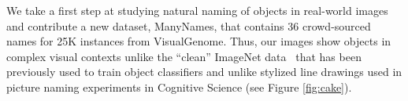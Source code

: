 
We take a first step at studying natural naming of objects in real-world images and contribute a new dataset, ManyNames, that contains 36 crowd-sourced names for 25K instances from VisualGenome.
Thus, our images show objects in complex visual contexts
unlike the ``clean'' ImageNet data~\cite{imagenet_cvpr09} that has been previously used to train object classifiers \cite{ILSVRC15} and unlike stylized line drawings used in picture naming experiments in Cognitive Science (see Figure \ref{fig:cake}).

